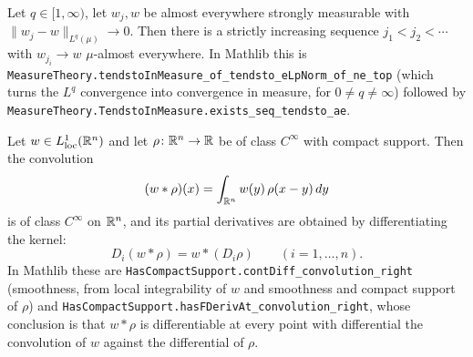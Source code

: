 \begin{proposition}
Let $q\in[1,\infty)$, let $w_j,w$ be almost everywhere strongly measurable with
$\|w_j-w\|_{L^{q}(\mu)}\to0$.  Then there is a strictly increasing sequence
$j_1<j_2<\cdots$ with $w_{j_i}\to w$ $\mu$-almost everywhere.  In Mathlib this
is \texttt{MeasureTheory.tendstoInMeasure\_of\_tendsto\_eLpNorm\_of\_ne\_top}
(which turns the $L^{q}$ convergence into convergence in measure, for
$0\ne q\ne\infty$) followed by
\texttt{MeasureTheory.TendstoInMeasure.exists\_seq\_tendsto\_ae}.
\end{proposition}

\begin{proposition}
Let $w\in L^{1}_{\mathrm{loc}}(\mathbb{R}^n)$ and let $\rho\colon\mathbb{R}^n\to\mathbb{R}$ be of class
$C^{\infty}$ with compact support.  Then the convolution
\[
(w*\rho)(x)=\int_{\mathbb{R}^n}w(y)\,\rho(x-y)\,dy
\]
is of class $C^{\infty}$ on $\mathbb{R}^n$, and its partial derivatives are obtained by
differentiating the kernel:
\[
D_i(w*\rho)=w*(D_i\rho)\qquad(i=1,\dots,n).
\]
In Mathlib these are \texttt{HasCompactSupport.contDiff\_convolution\_right}
(smoothness, from local integrability of $w$ and smoothness and compact support
of $\rho$) and \texttt{HasCompactSupport.hasFDerivAt\_convolution\_right}, whose
conclusion is that $w*\rho$ is differentiable at every point with differential
the convolution of $w$ against the differential of $\rho$.
\end{proposition}

